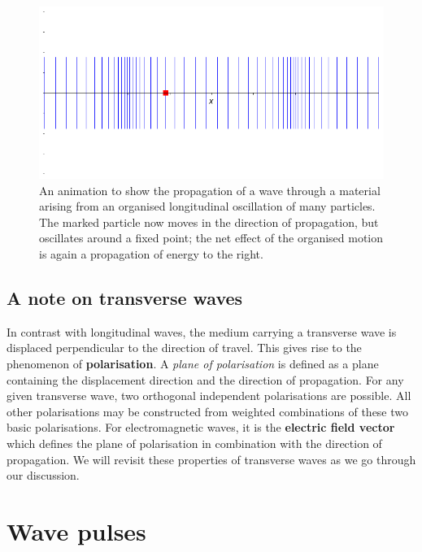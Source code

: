 \documentclass[
]{book}
\begin{document}
\begin{figure}

{\centering \includegraphics[width=0.7\linewidth]{visualisations/ch6-longitudinalwave1} 

}

\caption{An animation to show the propagation of a wave through a material arising from an organised longitudinal oscillation of many particles. The marked particle now  moves in the direction of propagation, but oscillates around a fixed point; the net effect of the organised motion is again a propagation of energy to the right.}\label{fig:ch6-longitudinalwaveill1}
\end{figure}

\hypertarget{a-note-on-transverse-waves}{%
\subsection*{A note on transverse waves}\label{a-note-on-transverse-waves}}

In contrast with longitudinal waves, the medium carrying a transverse wave is displaced perpendicular to the direction of travel. This gives rise to the phenomenon of \textbf{polarisation}. A \emph{plane of polarisation} is defined as a plane containing the displacement direction and the direction of propagation. For any given transverse wave, two orthogonal independent polarisations are possible. All other polarisations may be constructed from weighted combinations of these two basic polarisations. For electromagnetic waves, it is the \textbf{electric field vector} which defines the plane of polarisation in combination with the direction of propagation. We will revisit these properties of transverse waves as we go through our discussion.

\hypertarget{sec-ch6-wavepulses}{%
\section{Wave pulses}\label{sec-ch6-wavepulses}}
\end{document}
